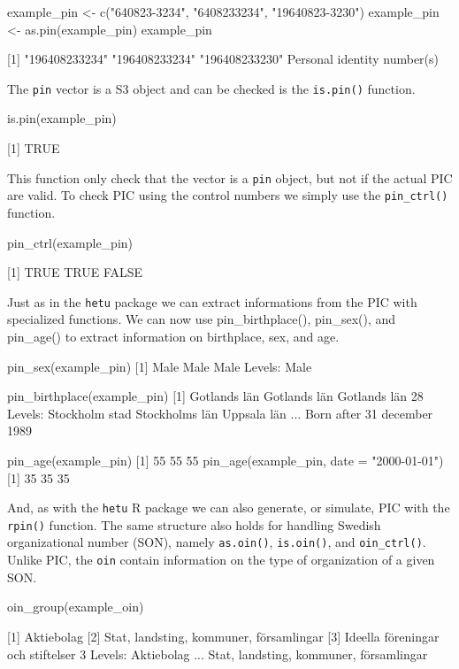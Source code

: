  \begin{example}
   example_pin <- c("640823-3234", "6408233234", "19640823-3230")
   example_pin <- as.pin(example_pin)
   example_pin

   [1] "196408233234" "196408233234" "196408233230"
   Personal identity number(s)
 \end{example}

 The \texttt{pin} vector is a S3 object and can be checked is the \texttt{is.pin()} function.

 \begin{example}
   is.pin(example_pin)

   [1] TRUE
 \end{example}

 This function only check that the vector is a \texttt{pin} object, but not if the actual PIC are valid. To check PIC using the control numbers we simply use the \texttt{pin\_ctrl()} function.

 \begin{example}
   pin_ctrl(example_pin)

   [1]  TRUE  TRUE FALSE
 \end{example}

 Just as in the \texttt{hetu} package we can extract informations from the PIC with specialized functions. We can now use pin\_birthplace(), pin\_sex(), and pin\_age() to extract information on birthplace, sex, and age.

 \begin{example}
   pin_sex(example_pin)
   [1] Male Male Male
   Levels: Male

   pin_birthplace(example_pin)
   [1] Gotlands län Gotlands län Gotlands län
   28 Levels: Stockholm stad Stockholms län Uppsala län ... Born after 31 december 1989

   pin_age(example_pin)
   [1] 55 55 55
   pin_age(example_pin, date = "2000-01-01")
   [1] 35 35 35
 \end{example}

 And, as with the \texttt{hetu} R package we can also generate, or simulate, PIC with the \texttt{rpin()} function. The same structure also holds for handling Swedish organizational number (SON), namely \texttt{as.oin()}, \texttt{is.oin()}, and \texttt{oin\_ctrl()}. Unlike PIC, the \texttt{oin} contain information on the type of organization of a given SON.

 \begin{example}
   oin_group(example\_oin)

   [1] Aktiebolag
   [2] Stat, landsting, kommuner, församlingar
   [3] Ideella föreningar och stiftelser
   3 Levels: Aktiebolag ... Stat, landsting, kommuner, församlingar
 \end{example}

